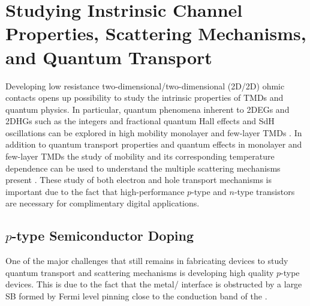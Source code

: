 \chapter{Studying Instrinsic Channel Properties, Scattering Mechanisms, and Quantum Transport}\label{chap:results}
Developing low resistance two-dimensional/two-dimensional (2D/2D) ohmic contacts opens up possibility to study the intrinsic properties of \acp{TMD} and quantum physics. In particular, quantum phenomena inherent to \acp{2DEG} and \acp{2DHG} such as the integers and fractional quantum Hall effects and \ac{SdH} oscillations can be explored in high mobility monolayer and few-layer \acp{TMD} \cite{Cui_NatureNano2015}. In addition to quantum transport properties and quantum effects in monolayer and few-layer \acp{TMD} the study of mobility and its corresponding temperature dependence can be used to understand the multiple scattering mechanisms present \cite{Kaasbjerg_PhysRevB2012}. These study of both electron and hole transport mechanisms is important due to the fact that high-performance $p$-type and $n$-type transistors are necessary for complimentary digital applications. 

\section{$p$-type  Semiconductor Doping}\label{sec:mos2_doping}
One of the major challenges that still remains in fabricating devices to study quantum transport and scattering mechanisms is developing high quality $p$-type  devices. This is due to the fact that the metal/ interface is obstructed by a large \ac{SB} formed by Fermi level pinning close to the conduction band of the  \cite{Chuang_NanoLett2014,Das_NanoLett2012}. 

